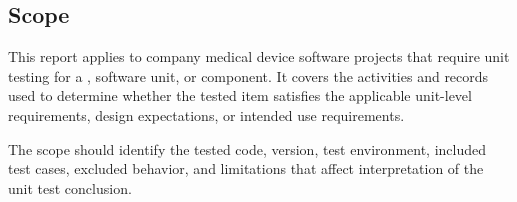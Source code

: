 \subsection{Scope}
This report applies to \Gls{company} medical device software projects that
require unit testing for a \stdCfgItem, software unit, or component.  It covers
the activities and records used to determine whether the tested item satisfies
the applicable unit-level requirements, design expectations, or intended use
requirements.

\tlcVspace

The scope should identify the tested code, version, test environment, included
test cases, excluded behavior, and limitations that affect interpretation of the
unit test conclusion.
